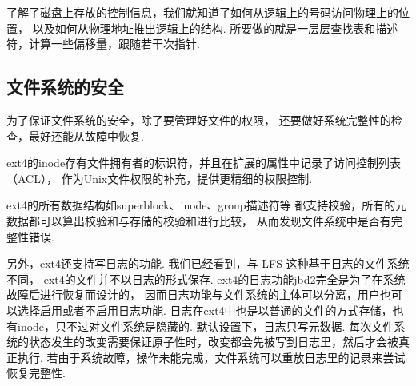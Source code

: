 了解了磁盘上存放的控制信息，我们就知道了如何从逻辑上的号码访问物理上的位置，
以及如何从物理地址推出逻辑上的结构.
所要做的就是一层层查找表和描述符，计算一些偏移量，跟随若干次指针.

\subsection{文件系统的安全}
为了保证文件系统的安全，除了要管理好文件的权限，
还要做好系统完整性的检查，最好还能从故障中恢复.

ext4的inode存有文件拥有者的标识符，并且在扩展的属性中记录了访问控制列表（ACL），
作为Unix文件权限的补充，提供更精细的权限控制.

ext4的所有数据结构如superblock、inode、group描述符等
都支持校验，所有的元数据都可以算出校验和与存储的校验和进行比较，
从而发现文件系统中是否有完整性错误.\cite{ext4high}

另外，ext4还支持写日志的功能.
我们已经看到，与 LFS \cite{rosenblum1992design}这种基于日志的文件系统不同，
ext4的文件并不以日志的形式保存.
ext4的日志功能jbd2完全是为了在系统故障后进行恢复而设计的，
因而日志功能与文件系统的主体可以分离，用户也可以选择启用或者不启用日志功能.
日志在ext4中也是以普通的文件的方式存储，也有inode，只不过对文件系统是隐藏的.
默认设置下，日志只写元数据.
每次文件系统的状态发生的改变需要保证原子性时，改变都会先被写到日志里，然后才会被真正执行.
若由于系统故障，操作未能完成，文件系统可以重放日志里的记录来尝试恢复完整性.


